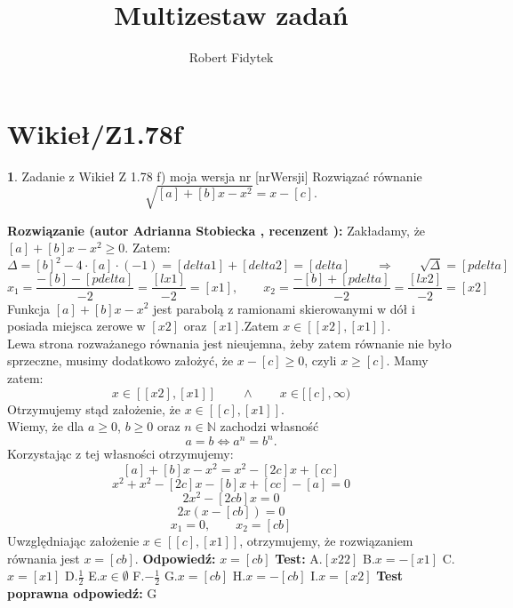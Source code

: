 \documentclass[12pt, a4paper]{article}
\title{Multizestaw zadań}
\author{Robert Fidytek}
\date{}
\theoremstyle{definition} %
\newtheorem{zad}{}
\newcommand{\kategoria}[1]{\section{#1}} %
\newcommand{\zadStart}[1]{\begin{zad}#1\newline} %
\newcommand{\zadStop}{\end{zad}}   %
\newcommand{\rozwStart}[2]{\noindent \textbf{Rozwiązanie (autor #1 , recenzent #2): }\newline} %
\newcommand{\rozwStop}{\newline}                                            %
\newcommand{\odpStart}{\noindent \textbf{Odpowiedź:}\newline}    %
\newcommand{\odpStop}{\newline}                                             %
\newcommand{\testStart}{\noindent \textbf{Test:}\newline} %
\newcommand{\testStop}{\newline} %
\newcommand{\kluczStart}{\noindent \textbf{Test poprawna odpowiedź:}\newline} %
\newcommand{\kluczStop}{\newline} %
\begin{document}
\maketitle


\kategoria{Wikieł/Z1.78f}
\zadStart{Zadanie z Wikieł Z 1.78 f) moja wersja nr [nrWersji]}
Rozwiązać równanie
$$\sqrt{[a]+[b]x-x^2}=x-[c].$$
\zadStop
\rozwStart{Adrianna Stobiecka}{}
Zakładamy, że $[a]+[b]x-x^2\geq0$. Zatem:
$$\Delta=[b]^2-4\cdot[a]\cdot(-1)=[delta1]+[delta2]=[delta]\qquad\Rightarrow\qquad\sqrt{\Delta}=[pdelta]$$
$$x_1=\frac{-[b]-[pdelta]}{-2}=\frac{[lx1]}{-2}=[x1],\qquad x_2=\frac{-[b]+[pdelta]}{-2}=\frac{[lx2]}{-2}=[x2]$$
Funkcja $[a]+[b]x-x^2$ jest parabolą z ramionami skierowanymi w dół i posiada miejsca zerowe w $[x2]$ oraz $[x1]$.Zatem $x\in[[x2],[x1]]$.
\\Lewa strona rozważanego równania jest nieujemna, żeby zatem równanie nie było sprzeczne, musimy dodatkowo założyć, że $x-[c]\geq0$, czyli $x\geq[c]$.
Mamy zatem:
$$x\in[[x2],[x1]]\qquad\land\qquad x\in[[c],\infty)$$
Otrzymujemy stąd założenie, że $x\in[[c],[x1]]$.
\\Wiemy, że dla $a\geq0$, $b\geq0$ oraz $n\in\mathbb{N}$ zachodzi własność
$$a=b\Leftrightarrow a^n=b^n.$$ 
Korzystając z tej własności otrzymujemy:
$$[a]+[b]x-x^2=x^2-[2c]x+[cc]$$
$$x^2+x^2-[2c]x-[b]x+[cc]-[a]=0$$
$$2x^2-[2cb]x=0$$
$$2x(x-[cb])=0$$
$$x_1=0,\qquad x_2=[cb]$$
Uwzględniając założenie $x\in[[c],[x1]]$, otrzymujemy, że rozwiązaniem równania jest $x=[cb].$
\rozwStop
\odpStart
$x=[cb]$
\odpStop
\testStart
A.$[x22]$
B.$x=-[x1]$
C.$x=[x1]$
D.$\frac{1}{2}$
E.$x\in\emptyset$
F.$-\frac{1}{2}$
G.$x=[cb]$
H.$x=-[cb]$
I.$x=[x2]$
\testStop
\kluczStart
G
\kluczStop
\end{document}
